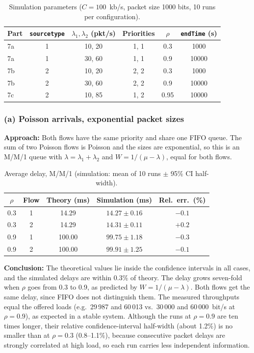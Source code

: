 ﻿\documentclass[12pt]{article}
\begin{document}
\begin{table}[H]
    \centering \small
    \caption{Simulation parameters ($C=100$~kb/s, packet size 1000 bits, 10 runs per configuration).}
    \label{tab:ppl-params}
    \begin{tabular}{lccccc}
        Part & \texttt{sourcetype} & $\lambda_1,\lambda_2$ (pkt/s) & Priorities & $\rho$ & \texttt{endTime} (s) \\
        \hline
        7a & 1 & 10, 20 & 1, 1 & 0.3  & 1000 \\
        7a & 1 & 30, 60 & 1, 1 & 0.9  & 10000 \\
        7b & 2 & 10, 20 & 2, 2 & 0.3  & 1000 \\
        7b & 2 & 30, 60 & 2, 2 & 0.9  & 10000 \\
        7c & 2 & 10, 85 & 1, 2 & 0.95 & 10000 \\
    \end{tabular}
\end{table}

\subsubsection{(a) Poisson arrivals, exponential packet sizes}

\textbf{Approach:} Both flows have the same priority and share one FIFO queue.
The sum of two Poisson flows is Poisson and the sizes are exponential, so this is
an M/M/1 queue with $\lambda=\lambda_1+\lambda_2$ and
$W=1/(\mu-\lambda)$, equal for both flows.

\begin{table}[H]
    \centering
    \caption{Average delay, M/M/1 (simulation: mean of 10 runs $\pm$ 95\% CI half-width).}
    \label{tab:ppl-mm1}
    \begin{tabular}{cc|ccc}
        $\rho$ & Flow & Theory (ms) & Simulation (ms) & Rel.\ err.\ (\%) \\
        \hline
        0.3 & 1 & 14.29  & $14.27\pm0.16$ & $-0.1$ \\
        0.3 & 2 & 14.29  & $14.31\pm0.11$ & $+0.2$ \\
        0.9 & 1 & 100.00 & $99.75\pm1.18$ & $-0.3$ \\
        0.9 & 2 & 100.00 & $99.91\pm1.25$ & $-0.1$ \\
    \end{tabular}
\end{table}

\textbf{Conclusion:} The theoretical values lie inside the confidence intervals
in all cases, and the simulated delays are within 0.3\% of theory. The delay
grows seven-fold when $\rho$ goes from 0.3 to 0.9, as predicted by
$W=1/(\mu-\lambda)$. Both flows get the same delay, since FIFO does not
distinguish them. The measured throughputs equal the offered loads (e.g.\
29\,987 and 60\,013 vs.\ 30\,000 and 60\,000~bit/s at $\rho=0.9$), as expected in a
stable system. Although the runs at $\rho=0.9$ are ten times longer, their
relative confidence-interval half-width (about 1.2\%) is no smaller than at
$\rho=0.3$ (0.8--1.1\%), because consecutive packet delays are strongly
correlated at high load, so each run carries less independent information.
\end{document}
